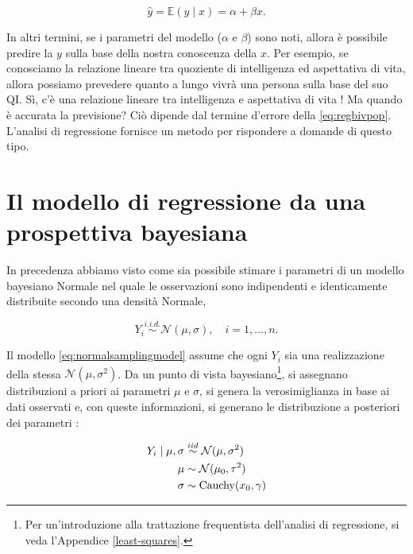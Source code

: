 \documentclass[
]{memoir}
\DeclareMathOperator{\Cauchy}{Cauchy} %
\begin{document}
\begin{equation}
\hat{y} = \mathbb{E}(y \mid x) = \alpha + \beta x.
\label{eq:regbivpop2}
\end{equation}

In altri termini, se i parametri del modello (\(\alpha\) e \(\beta\)) sono noti, allora è possibile predire la \(y\) sulla base della nostra conoscenza della \(x\).
Per esempio, se conosciamo la relazione lineare tra quoziente di intelligenza ed aspettativa di vita, allora possiamo prevedere quanto a lungo vivrà una persona sulla base del suo QI. Sì, c'è una relazione lineare tra intelligenza e aspettativa di vita \citep{hambrick2015research}! Ma quando è accurata la previsione? Ciò dipende dal termine d'errore della \eqref{eq:regbivpop}. L'analisi di regressione fornisce un metodo per rispondere a domande di questo tipo.

\hypertarget{il-modello-di-regressione-da-una-prospettiva-bayesiana}{%
\section{Il modello di regressione da una prospettiva bayesiana}\label{il-modello-di-regressione-da-una-prospettiva-bayesiana}}

In precedenza abbiamo visto come sia possibile stimare i parametri di un modello bayesiano Normale nel quale le osservazioni sono indipendenti e identicamente distribuite secondo una densità Normale,

\begin{equation}
Y_i \stackrel{i.i.d.}{\sim} \mathcal{N}(\mu, \sigma), \quad i = 1, \dots, n.
\label{eq:normalsamplingmodel}
\end{equation}

Il modello \eqref{eq:normalsamplingmodel} assume che ogni \(Y_i\) sia una realizzazione della stessa \(\mathcal{N}(\mu, \sigma^2)\). Da un punto di vista bayesiano\footnote{Per un'introduzione alla trattazione frequentista dell'analisi di regressione, si veda l'Appendice \ref{least-squares}.}, si assegnano distribuzioni a priori ai parametri \(\mu\) e \(\sigma\), si genera la verosimiglianza in base ai dati osservati e, con queste informazioni, si generano le distribuzione a posteriori dei parametri \citep{gelman2020regression}:

\begin{align}
Y_i \mid \mu, \sigma & \stackrel{iid}{\sim} \mathcal{N}(\mu, \sigma^2)\notag\\
\mu       & \sim \mathcal{N}(\mu_0, \tau^2) \notag\\
\sigma    & \sim \Cauchy(x_0, \gamma) \notag
\end{align}
\end{document}

